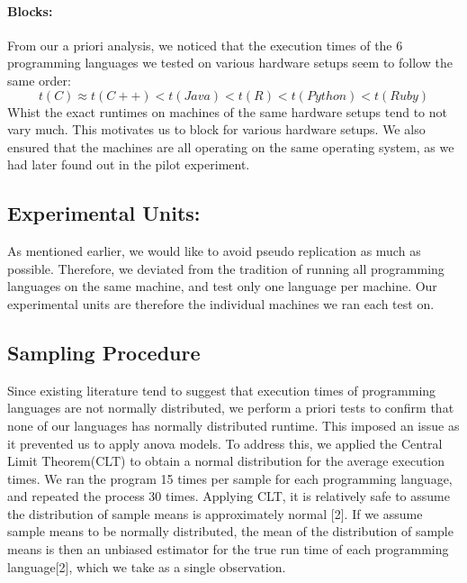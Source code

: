 \documentclass[12pt,halfline,a4paper,]{ouparticle}
\begin{document}
\hypertarget{blocks}{%
\paragraph{Blocks:}\label{blocks}}

From our a priori analysis, we noticed that the execution times of the 6
programming languages we tested on various hardware setups seem to
follow the same order: \begin{equation}
t(C) \approx t(C++) < t(Java) < t(R) < t(Python) < t(Ruby)
\end{equation} Whist the exact runtimes on machines of the same hardware
setups tend to not vary much. This motivates us to block for various
hardware setups. We also ensured that the machines are all operating on
the same operating system, as we had later found out in the pilot
experiment.

\hypertarget{experimental-units}{%
\subsection{Experimental Units:}\label{experimental-units}}

As mentioned earlier, we would like to avoid pseudo replication as much
as possible. Therefore, we deviated from the tradition of running all
programming languages on the same machine, and test only one language
per machine. Our experimental units are therefore the individual
machines we ran each test on.

\hypertarget{sampling-procedure}{%
\subsection{Sampling Procedure}\label{sampling-procedure}}

Since existing literature tend to suggest that execution times of
programming languages are not normally distributed, we perform a priori
tests to confirm that none of our languages has normally distributed
runtime. This imposed an issue as it prevented us to apply anova models.
To address this, we applied the Central Limit Theorem(CLT) to obtain a
normal distribution for the average execution times. We ran the program
15 times per sample for each programming language, and repeated the
process 30 times. Applying CLT, it is relatively safe to assume the
distribution of sample means is approximately normal {[}2{]}. If we
assume sample means to be normally distributed, the mean of the
distribution of sample means is then an unbiased estimator for the true
run time of each programming language{[}2{]}, which we take as a single
observation.
\end{document}
